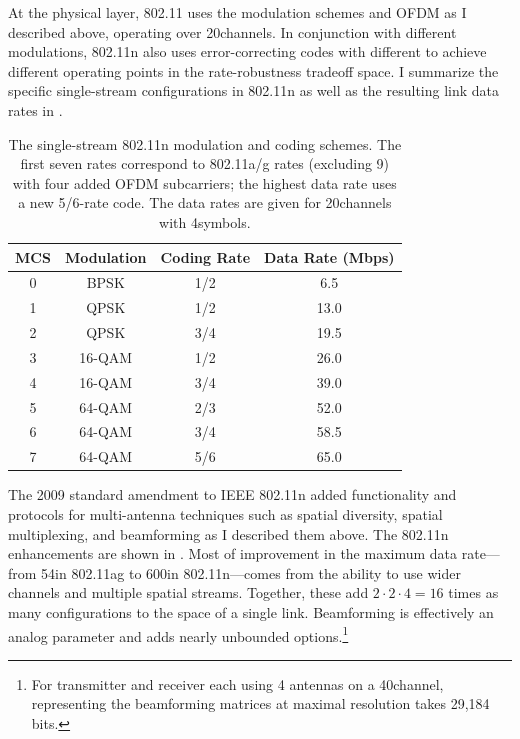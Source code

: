 At the physical layer, 802.11 uses the modulation schemes and OFDM as I described above, operating over 20\MHz channels. In conjunction with different modulations, 802.11n also uses error-correcting codes with different  to achieve different operating points in the rate-robustness tradeoff space. I summarize the specific single-stream configurations in 802.11n as well as the resulting link data rates in .

\begin{table}[t]
\centering
\begin{tabular}{cccc}
\toprule
\bf MCS & \bf Modulation & \bf Coding Rate & \bf Data Rate (Mbps) \\
\midrule
0 & BPSK & 1/2 & 6.5 \\
1 & QPSK & 1/2 & 13.0\\
2 & QPSK & 3/4 & 19.5\\
3 & 16-QAM & 1/2 & 26.0\\
4 & 16-QAM & 3/4 & 39.0\\
5 & 64-QAM & 2/3 & 52.0\\
6 & 64-QAM & 3/4 & 58.5\\
7 & 64-QAM & 5/6 & 65.0\\
\bottomrule
\end{tabular}
\caption[The 802.11n single-stream rates.]{\label{tab:siso_mcs} The single-stream 802.11n modulation and coding schemes. The first seven rates correspond to 802.11a/g rates (excluding 9\Mbps) with four added OFDM subcarriers; the highest data rate uses a new 5/6-rate code. The data rates are given for 20\MHz channels with 4\ms symbols.}
\end{table}

The 2009 standard amendment to IEEE 802.11n added functionality and protocols for multi-antenna techniques such as spatial diversity, spatial multiplexing, and beamforming as I described them above. The 802.11n enhancements are shown in . Most of improvement in the maximum data rate---from 54\Mbps in 802.11ag to 600\Mbps in 802.11n---comes from the ability to use wider channels and multiple spatial streams. Together, these add $2\cdot2\cdot4=16$ times as many configurations to the space of a single link. Beamforming is effectively an analog parameter and adds nearly unbounded options.\footnote{For transmitter and receiver each using 4 antennas on a 40\MHz channel, representing the beamforming matrices at maximal resolution takes 29,184 bits.}

